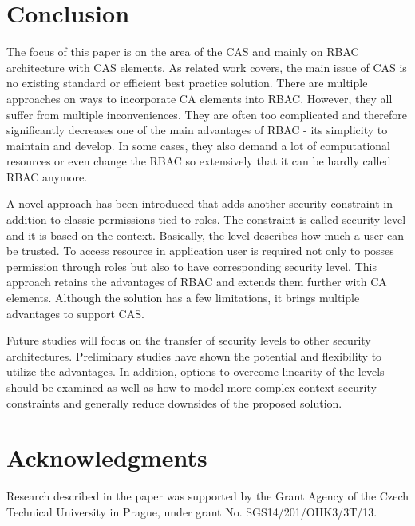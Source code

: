 \documentclass{sig-alternate-05-2015}
\begin{document}
\section{Conclusion}
The focus of this paper is on the area of the CAS and mainly on RBAC architecture with CAS elements. As related work covers, the main issue of CAS is no existing standard or efficient best practice solution. There are multiple approaches on ways to incorporate CA elements into RBAC. However, they all suffer from multiple inconveniences. They are often too complicated and therefore significantly decreases one of the main advantages of RBAC - its simplicity to maintain and develop. In some cases, they also demand a lot of computational resources or even change the RBAC so extensively that it can be hardly called RBAC anymore.

A novel approach has been introduced that adds another security constraint in addition to classic permissions tied to roles. The constraint is called security level and it is based on the context. Basically, the level describes how much a user can be trusted. To access resource in application user is required not only to posses permission through roles but also to have corresponding security level. This approach retains the advantages of RBAC and extends them further with CA elements. Although the solution has a few limitations, it brings multiple advantages to support CAS. 

Future studies will focus on the transfer of security levels to other security architectures. Preliminary studies have shown the potential and flexibility to utilize the advantages. In addition, options to overcome linearity of the levels should be examined as well as how to model more complex context security constraints and generally reduce downsides of the proposed solution.

\section{Acknowledgments}
Research described in the paper was supported by the Grant Agency of the Czech Technical University in Prague, under grant No. SGS14/201/OHK3/3T/13.

%

%
%
\end{document}
